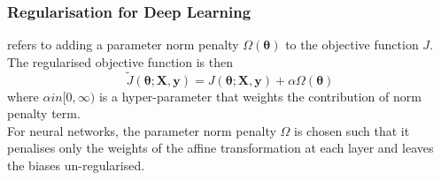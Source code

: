 \subsubsection{Regularisation for Deep Learning}

\begin{definition}  refers to adding a parameter norm penalty $\Omega(\bm{\theta})$ to the objective function $J$. The regularised objective function is then
\begin{equation}
\tilde{J}(\bm{\theta}; \bm{X}, \bm{y}) = J(\bm{\theta}; \bm{X}, \bm{y}) + \alpha \Omega(\bm{\theta}) \nonumber
\end{equation}
where $\alpha in [0, \infty)$ is a hyper-parameter that weights the contribution of norm penalty term.\\
For neural networks, the parameter norm penalty $\Omega$ is chosen such that it penalises only the weights of the affine transformation at each layer and leaves the biases un-regularised.
\end{definition}
